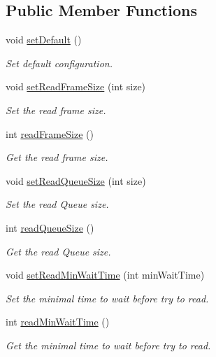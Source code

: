 \subsection*{Public Member Functions}
\begin{DoxyCompactItemize}
\item 
void \hyperlink{classmdt_port_config_a1cad2f21252411977fe328f89b68fbfb}{setDefault} ()
\begin{DoxyCompactList}\small\item\em Set default configuration. \end{DoxyCompactList}\item 
void \hyperlink{classmdt_port_config_a02f3c9744b0d7a61853ab58467278bbc}{setReadFrameSize} (int size)
\begin{DoxyCompactList}\small\item\em Set the read frame size. \end{DoxyCompactList}\item 
int \hyperlink{classmdt_port_config_af4c2705ed15338f9fa5f895b2c9cf392}{readFrameSize} ()
\begin{DoxyCompactList}\small\item\em Get the read frame size. \end{DoxyCompactList}\item 
void \hyperlink{classmdt_port_config_a04d8e81844deaff20a890ea24e2f9634}{setReadQueueSize} (int size)
\begin{DoxyCompactList}\small\item\em Set the read Queue size. \end{DoxyCompactList}\item 
int \hyperlink{classmdt_port_config_acbeb17f5ee40cd4ab10e816ebd4db3ef}{readQueueSize} ()
\begin{DoxyCompactList}\small\item\em Get the read Queue size. \end{DoxyCompactList}\item 
void \hyperlink{classmdt_port_config_a42e984173a7868ea4f58c4d0c54b202f}{setReadMinWaitTime} (int minWaitTime)
\begin{DoxyCompactList}\small\item\em Set the minimal time to wait before try to read. \end{DoxyCompactList}\item 
int \hyperlink{classmdt_port_config_ad8b726b560af894424a07c536e54936e}{readMinWaitTime} ()
\begin{DoxyCompactList}\small\item\em Get the minimal time to wait before try to read. \end{DoxyCompactList}\item 

\end{DoxyCompactItemize}
